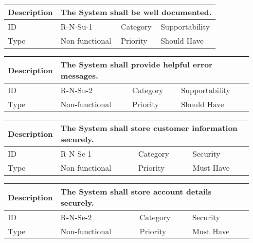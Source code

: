 \begin{tabular}{|p{1.5cm}|p{1.5cm}|p{1.5cm}|p{1.5cm}|p{1.5cm}|p{1.5cm}|p{1.5cm}|p{1.5cm}|p{1.5cm}|p{1.5cm}|p{1.5cm}|p{1.5cm}|}
    \hline
    \multicolumn{2}{|o|}{Description} & \multicolumn{10}{p{12.5cm}|}{The System shall be well documented.} \\ \hline
    \multicolumn{2}{|o|}{ID}          & \multicolumn{4}{n}{R-N-Su-1}           & \multicolumn{2}{|o|}{Category}    & \multicolumn{4}{n|}{Supportability} \\ \hline
    \multicolumn{2}{|o|}{Type}        & \multicolumn{4}{n}{Non-functional}     & \multicolumn{2}{|o|}{Priority}    & \multicolumn{4}{n|}{Should Have}  \\ \hline
\end{tabular}

\begin{tabular}{|p{1.5cm}|p{1.5cm}|p{1.5cm}|p{1.5cm}|p{1.5cm}|p{1.5cm}|p{1.5cm}|p{1.5cm}|p{1.5cm}|p{1.5cm}|p{1.5cm}|p{1.5cm}|}
    \hline
    \multicolumn{2}{|o|}{Description} & \multicolumn{10}{p{12.5cm}|}{The System shall provide helpful error messages.} \\ \hline
    \multicolumn{2}{|o|}{ID}          & \multicolumn{4}{n}{R-N-Su-2}           & \multicolumn{2}{|o|}{Category}    & \multicolumn{4}{n|}{Supportability} \\ \hline
    \multicolumn{2}{|o|}{Type}        & \multicolumn{4}{n}{Non-functional}     & \multicolumn{2}{|o|}{Priority}    & \multicolumn{4}{n|}{Should Have}  \\ \hline
\end{tabular}

\begin{tabular}{|p{1.5cm}|p{1.5cm}|p{1.5cm}|p{1.5cm}|p{1.5cm}|p{1.5cm}|p{1.5cm}|p{1.5cm}|p{1.5cm}|p{1.5cm}|p{1.5cm}|p{1.5cm}|}
    \hline
    \multicolumn{2}{|o|}{Description} & \multicolumn{10}{p{12.5cm}|}{The System shall store customer information securely.} \\ \hline
    \multicolumn{2}{|o|}{ID}          & \multicolumn{4}{n}{R-N-Se-1}           & \multicolumn{2}{|o|}{Category}    & \multicolumn{4}{n|}{Security} \\ \hline
    \multicolumn{2}{|o|}{Type}        & \multicolumn{4}{n}{Non-functional}     & \multicolumn{2}{|o|}{Priority}    & \multicolumn{4}{n|}{Must Have}  \\ \hline
\end{tabular}

\begin{tabular}{|p{1.5cm}|p{1.5cm}|p{1.5cm}|p{1.5cm}|p{1.5cm}|p{1.5cm}|p{1.5cm}|p{1.5cm}|p{1.5cm}|p{1.5cm}|p{1.5cm}|p{1.5cm}|}
    \hline
    \multicolumn{2}{|o|}{Description} & \multicolumn{10}{p{12.5cm}|}{The System shall store account details securely.} \\ \hline
    \multicolumn{2}{|o|}{ID}          & \multicolumn{4}{n}{R-N-Se-2}           & \multicolumn{2}{|o|}{Category}    & \multicolumn{4}{n|}{Security} \\ \hline
    \multicolumn{2}{|o|}{Type}        & \multicolumn{4}{n}{Non-functional}     & \multicolumn{2}{|o|}{Priority}    & \multicolumn{4}{n|}{Must Have}  \\ \hline
\end{tabular}